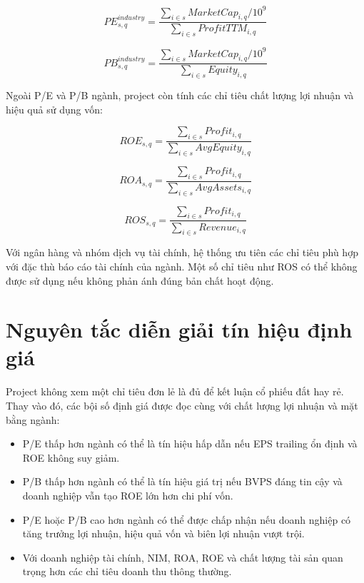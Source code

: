 \documentclass[12pt,a4paper]{article}
\begin{document}
\begin{equation}
    PE^{industry}_{s,q}
    =
    \frac{\sum_{i \in s} MarketCap_{i,q} / 10^9}
    {\sum_{i \in s} ProfitTTM_{i,q}}
\end{equation}

\begin{equation}
    PB^{industry}_{s,q}
    =
    \frac{\sum_{i \in s} MarketCap_{i,q} / 10^9}
    {\sum_{i \in s} Equity_{i,q}}
\end{equation}

Ngoài P/E và P/B ngành, project còn tính các chỉ tiêu chất lượng lợi nhuận và hiệu quả sử dụng vốn:

\begin{equation}
    ROE_{s,q} = \frac{\sum_{i \in s} Profit_{i,q}}{\sum_{i \in s} AvgEquity_{i,q}}
\end{equation}

\begin{equation}
    ROA_{s,q} = \frac{\sum_{i \in s} Profit_{i,q}}{\sum_{i \in s} AvgAssets_{i,q}}
\end{equation}

\begin{equation}
    ROS_{s,q} = \frac{\sum_{i \in s} Profit_{i,q}}{\sum_{i \in s} Revenue_{i,q}}
\end{equation}

Với ngân hàng và nhóm dịch vụ tài chính, hệ thống ưu tiên các chỉ tiêu phù hợp với đặc thù báo cáo tài chính của ngành. Một số chỉ tiêu như ROS có thể không được sử dụng nếu không phản ánh đúng bản chất hoạt động.

\section{Nguyên tắc diễn giải tín hiệu định giá}

Project không xem một chỉ tiêu đơn lẻ là đủ để kết luận cổ phiếu đắt hay rẻ. Thay vào đó, các bội số định giá được đọc cùng với chất lượng lợi nhuận và mặt bằng ngành:

\begin{itemize}
    \item P/E thấp hơn ngành có thể là tín hiệu hấp dẫn nếu EPS trailing ổn định và ROE không suy giảm.
    \item P/B thấp hơn ngành có thể là tín hiệu giá trị nếu BVPS đáng tin cậy và doanh nghiệp vẫn tạo ROE lớn hơn chi phí vốn.
    \item P/E hoặc P/B cao hơn ngành có thể được chấp nhận nếu doanh nghiệp có tăng trưởng lợi nhuận, hiệu quả vốn và biên lợi nhuận vượt trội.
    \item Với doanh nghiệp tài chính, NIM, ROA, ROE và chất lượng tài sản quan trọng hơn các chỉ tiêu doanh thu thông thường.
\end{itemize}
\end{document}

